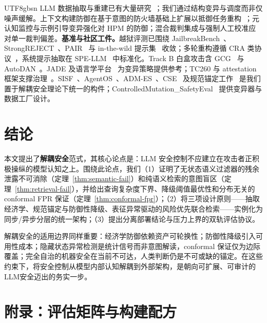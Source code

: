 \documentclass[letterpaper,twocolumn,10pt]{article}
\begin{document}
\begin{CJK}{UTF8}{gbsn}
LLM 数据抽取与重建已有大量研究~\cite{llm-reconstruction-emergent,split-ft-attack,active-reconstruction}；我们通过结构变异与调度而非仅噪声缓解。上下文构建防御在基于意图的防火墙基础上扩展以抵御任务重构~\cite{agentos-arxiv}；元认知监控与示例引导变异强化对 HPM 的防御；混合裁判集成与强制人工校准应对单一裁判偏差。\textbf{基准与社区工件。}越狱评测已围绕 JailbreakBench~\cite{jailbreakbench}、StrongREJECT~\cite{strongreject}、PAIR~\cite{pair-jailbreak} 与 in-the-wild 提示集~\cite{wild-jailbreak-prompts} 收敛；多轮重构遵循 CRA 类协议~\cite{cra-reconstruction}，系统提示抽取在 SPE-LLM~\cite{spe-llm} 中标准化。Track B 白盒攻击含 GCG~\cite{gcg} 与 AutoDAN~\cite{autodan}。JADE 及语言学平台~\cite{jade-linguistics,jade-db} 为变异策略提供参考；TC260 与 attestation 框架支撑治理~\cite{tc260-governance,tc260-training-data,dual-use-attestations}。SISF~\cite{sisf-arxiv}、AgentOS~\cite{agentos-arxiv}、ADM-ES~\cite{adm-es-arxiv}、CSE~\cite{cse-arxiv} 及规范锚定工作~\cite{epistemic-grounding,hpm-jailbreak} 是我们置于解耦安全理论下统一的构件；ControlledMutation\_SafetyEval~\cite{ControlledMutation_SafetyEval} 提供变异器与数据工厂设计。

\section{结论}
\label{sec:conclusion}

本文提出了\textbf{解耦安全}范式，其核心论点是：LLM 安全控制不应建立在攻击者正积极操纵的模型认知之上。围绕此论点，我们（1）证明了无状态语义过滤器的残余泄露不可消除（定理~\ref{thm:semantic-fail}）和纯语义检索的意图盲区（定理~\ref{thm:retrieval-fail}），并给出查询复杂度下界、降级阈值最优性和分布无关的 conformal FPR 保证（定理~\ref{thm:conformal-fpr}）；（2）将三项设计原则——抽取经济学、规范锚定与防御性降级、表征异常驱动的风险优先联合检索——实例化为同步/异步分层的统一架构；（3）提出分离部署结论与压力上界的双轨评估协议。

解耦安全的适用边界同样重要：经济学防御依赖资产可轮换性；防御性降级引入可用性成本；隐藏状态异常检测是统计信号而非意图解读，conformal 保证仅为边际覆盖；完全自治的机器安全在当前不可达，人类判断仍是不可或缺的锚定。在这些约束下，将安全控制从模型内部认知解耦到外部架构，是朝向可扩展、可审计的LLM安全迈出的务实一步。

\appendix
\section{附录：评估矩阵与构建配方}
\label{sec:appendix-eval}


\end{CJK}
\end{document}
